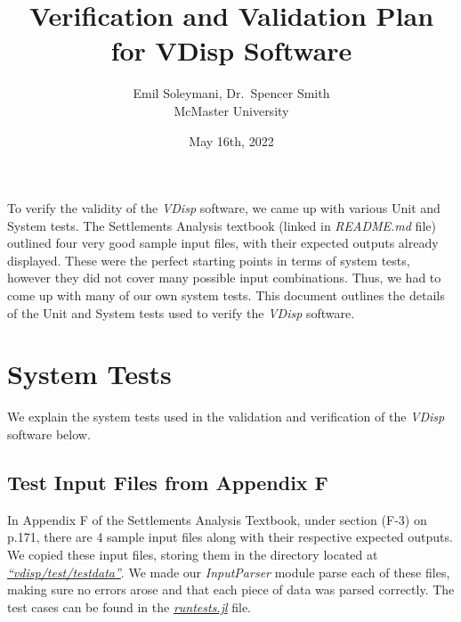 \documentclass[11pt,fleqn]{article}
\newcommand{\indentpar}{\phantom{=}}
\begin{document}
      
      \title{Verification and Validation Plan for VDisp Software}
      \date{May 16th, 2022}
      \author{Emil Soleymani, Dr.~Spencer Smith\\ McMaster University}
      \maketitle

      \medskip

      \indentpar To verify the validity of the \emph{VDisp} software, we came
      up with various Unit and System tests. The Settlements Analysis textbook (linked in \emph{README.md} 
      file) outlined four very good sample input files, with their expected outputs 
      already displayed. These were the perfect starting points in terms of system tests, however 
      they did not cover many possible input combinations. Thus, we had to come up with many of 
      our own system tests. This document outlines the details of the Unit and System tests
      used to verify the \emph{VDisp} software.
      
    
    \pagebreak

    \section*{System Tests}
    \indentpar We explain the system tests used in the validation and verification
    of the \emph{VDisp} software below.
    \subsection*{Test Input Files from Appendix F}
    \indentpar In Appendix F of the Settlements Analysis Textbook, under section (F-3) 
    on p.171, there are 4 sample input files along with their respective expected outputs.
    We copied these input files, storing them in the directory located at 
    \href{https://github.com/smiths/vdisp/tree/main/test/testdata}{\emph{“vdisp/test/testdata”}}.
    We made our \emph{InputParser} module parse each of these files, making sure no errors arose and 
    that each piece of data was parsed correctly. The test cases can be found in the 
    \href{https://github.com/smiths/vdisp/tree/main/test/runtests.jl}{\emph{runtests.jl}} file.
\end{document}
